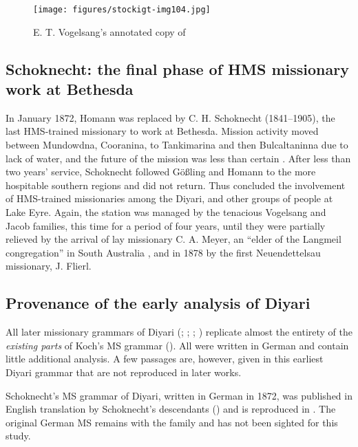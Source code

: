 \begin{figure}
\texttt{[image: figures/stockigt-img104.jpg]}
\caption{E. T. Vogelsang’s annotated copy of \citet{flierl_christianieli_1880}}
\label{bkm:Ref459735372}\label{fig:key:155}
\end{figure}

\subsection{Schoknecht: the final phase of HMS missionary work at Bethesda}
\label{sec:key:8.3.3}\label{bkm:Ref456087018}

In January 1872, Homann was replaced by C. H. Schoknecht (1841--1905), the last HMS-trained missionary to work at Bethesda. Mission activity moved between Mundowdna, Cooranina, to Tankimarina and then Bulcaltaninna due to lack of water, and the future of the mission was less than certain \citep[63--67]{Harms2003}. After less than two years' service, Schoknecht followed Gößling and Homann to the more hospitable southern regions and did not return. Thus concluded the involvement of HMS-trained missionaries among the Diyari, and other groups of people at Lake Eyre. Again, the station was managed by the tenacious Vogelsang and Jacob families, this time for a period of four years, until they were partially relieved by the arrival of lay missionary C. A. Meyer, an “elder of the Langmeil congregation” in South Australia \citep[189]{hebart_united_1938}, and in 1878 by the first Neuendettelsau missionary, J. Flierl.

\subsection{Provenance of the early analysis of Diyari}
\label{sec:key:8.3.4}\label{bkm:Ref326948006}

All later missionary grammars of Diyari (\citealt{Schoknecht1872}; \citealt{flierl_dieri_1880}; \citealt{reuther_dieri_1894}; \citeyear{reuther_ms_1899}) replicate almost the entirety of the \textit{existing parts} of Koch’s MS grammar (\citeyear{koch_untitled_1868}). All were written in German and contain little additional analysis. A few passages are, however, given in this earliest Diyari grammar that are not reproduced in later works.

 Schoknecht’s MS grammar of Diyari, written in German in 1872, was published in English translation by Schoknecht’s descendants (\citeyear{schoknecht_grammar_1947}) and is reproduced in \citet{kneebone_language_2005}. The original German MS remains with the family and has not been sighted for this study.

